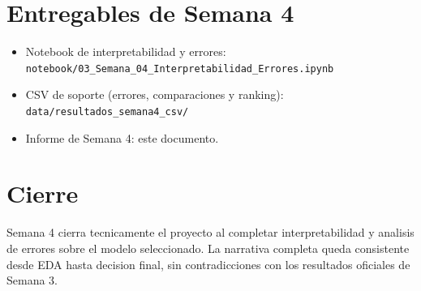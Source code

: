 \documentclass[11pt,a4paper]{article}
\begin{document}
\section{Entregables de Semana 4}

\begin{itemize}[leftmargin=1.2cm]
\item Notebook de interpretabilidad y errores: \texttt{notebook/03\_Semana\_04\_Interpretabilidad\_Errores.ipynb}
\item CSV de soporte (errores, comparaciones y ranking): \texttt{data/resultados\_semana4\_csv/}
\item Informe de Semana 4: este documento.
\end{itemize}

\section{Cierre}

Semana 4 cierra tecnicamente el proyecto al completar interpretabilidad y analisis de errores sobre el modelo seleccionado. La narrativa completa queda consistente desde EDA hasta decision final, sin contradicciones con los resultados oficiales de Semana 3.
\end{document}
